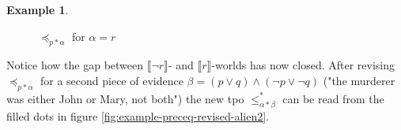 \documentclass[english, 12pt]{scrartcl}
\theoremstyle{definition}
\newtheorem{example}{Example}
\theoremstyle{definition}
\theoremstyle{definition}
\newcommand{\modelsOf}[1]{\llbracket #1 \rrbracket}
\begin{document}
\begin{example}
\begin{figure}[H]
            \caption{$\preceq_{p \ast \alpha}$ for $\alpha = r$}
            \label{fig:example-preceq-revised-alien}
    \end{figure}
    
    Notice how the gap between $\modelsOf{\neg r}$- and $\modelsOf{r}$-worlds has now closed. After revising $\preceq_{p \ast \alpha}$ for a second piece of evidence $\beta = (p \vee q) \wedge (\neg p \vee \neg q)$ ("the murderer was either John or Mary, not both") the new tpo $\leq_{\alpha \ast \beta}^{\ast}$ can be read from the filled dots in figure \ref{fig:example-preceq-revised-alien2}.
    

\end{example}
\end{document}
